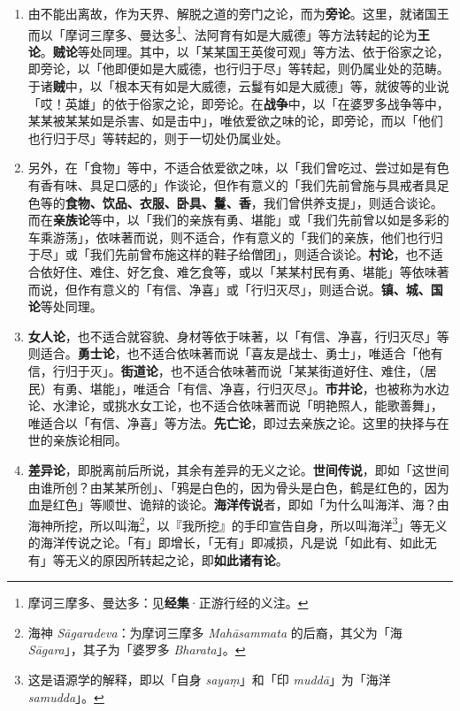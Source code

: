 \begin{enumerate}\item 由不能出离故，作为天界、解脱之道的旁门之论，而为\textbf{旁论}。这里，就诸国王而以「摩诃三摩多、曼达多\footnote{摩诃三摩多、曼达多：见\textbf{经集}·正游行经的义注。}、法阿育有如是大威德」等方法转起的论为\textbf{王论}。\textbf{贼论}等处同理。其中，以「某某国王英俊可观」等方法、依于俗家之论，即旁论，以「他即便如是大威德，也行归于尽」等转起，则仍属业处的范畴。于诸\textbf{贼}中，以「根本天有如是大威德，云鬘有如是大威德」等，就彼等的业说「哎！英雄」的依于俗家之论，即旁论。在\textbf{战争}中，以「在婆罗多战争等中，某某被某某如是杀害、如是击中」，唯依爱欲之味的论，即旁论，而以「他们也行归于尽」等转起的，则于一切处仍属业处。
\item 另外，在「食物」等中，不适合依爱欲之味，以「我们曾吃过、尝过如是有色有香有味、具足口感的」作谈论，但作有意义的「我们先前曾施与具戒者具足色等的\textbf{食物、饮品、衣服、卧具、鬘、香}，我们曾供养支提」，则适合谈论。而在\textbf{亲族论}等中，以「我们的亲族有勇、堪能」或「我们先前曾以如是多彩的车乘游荡」，依味著而说，则不适合，作有意义的「我们的亲族，他们也行归于尽」或「我们先前曾布施这样的鞋子给僧团」，则适合谈论。\textbf{村论}，也不适合依好住、难住、好乞食、难乞食等，或以「某某村民有勇、堪能」等依味著而说，但作有意义的「有信、净喜」或「行归灭尽」，则适合说。\textbf{镇、城、国论}等处同理。
\item \textbf{女人论}，也不适合就容貌、身材等依于味著，以「有信、净喜，行归灭尽」等则适合。\textbf{勇士论}，也不适合依味著而说「喜友是战士、勇士」，唯适合「他有信，行归于灭」。\textbf{街道论}，也不适合依味著而说「某某街道好住、难住，（居民）有勇、堪能」，唯适合「有信、净喜，行归灭尽」。\textbf{市井论}，也被称为水边论、水津论，或挑水女工论，也不适合依味著而说「明艳照人，能歌善舞」，唯适合以「有信、净喜」等方法。\textbf{先亡论}，即过去亲族之论。这里的抉择与在世的亲族论相同。
\item \textbf{差异论}，即脱离前后所说，其余有差异的无义之论。\textbf{世间传说}，即如「这世间由谁所创？由某某所创」、「鸦是白色的，因为骨头是白色，鹤是红色的，因为血是红色」等顺世、诡辩的谈论。\textbf{海洋传说}者，即如「为什么叫海洋、海？由海神所挖，所以叫海\footnote{海神 \textit{Sāgaradeva}：为摩诃三摩多 \textit{Mahāsammata} 的后裔，其父为「海 \textit{Sāgara}」，其子为「婆罗多 \textit{Bharata}」。}，以『我所挖』的手印宣告自身，所以叫海洋\footnote{这是语源学的解释，即以「自身 \textit{sayaṃ}」和「印 \textit{muddā}」为「海洋 \textit{samudda}」。}」等无义的海洋传说之论。「有」即增长，「无有」即减损，凡是说「如此有、如此无有」等无义的原因所转起之论，即\textbf{如此诸有论}。\end{enumerate}


